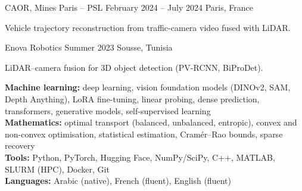 %
        {CAOR, Mines Paris -- PSL}%
        {February 2024 -- July 2024}%
        {Paris, France}
\begin{cvitems}
  \item Vehicle trajectory reconstruction from traffic-camera video fused with LiDAR.
\end{cvitems}

%
        {Enova Robotics}%
        {Summer 2023}%
        {Sousse, Tunisia}
\begin{cvitems}
  \item LiDAR--camera fusion for 3D object detection (PV-RCNN, BiProDet).
\end{cvitems}

\PublicationsBlockFull


\noindent
\textbf{Machine learning:} deep learning, vision foundation models (DINOv2, SAM, Depth Anything),
  LoRA fine-tuning, linear probing, dense prediction, transformers, generative models,
  self-supervised learning\\
\textbf{Mathematics:} optimal transport (balanced, unbalanced, entropic), convex and
  non-convex optimisation, statistical estimation, Cramér--Rao bounds, sparse recovery\\
\textbf{Tools:} Python, PyTorch, Hugging Face, NumPy/SciPy, C++, MATLAB, SLURM (HPC), Docker, Git\\
\textbf{Languages:} Arabic (native), French (fluent), English (fluent)

\EducationBlock
\CertificationBlock


